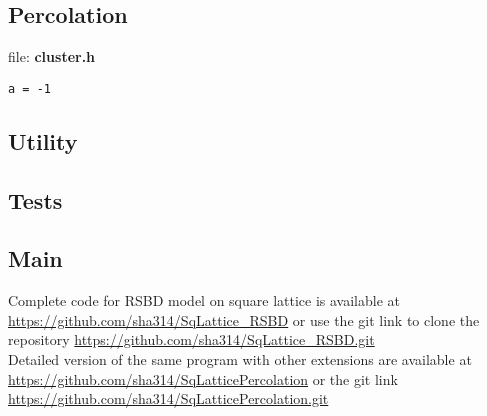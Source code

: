 	\subsection{Percolation}
	file: \textbf{cluster.h}
	\begin{lstlisting}[style=CStyle]
	a = -1
	\end{lstlisting}
	
	\subsection{Utility}
	
	\subsection{Tests}

	\subsection{Main}

	
Complete code for RSBD model on square lattice is available at
\url{https://github.com/sha314/SqLattice_RSBD}
or use the git link to clone the repository
\url{https://github.com/sha314/SqLattice_RSBD.git}
\\
Detailed version of the same program with other extensions are available at
\url{https://github.com/sha314/SqLatticePercolation}
or the git link
\url{https://github.com/sha314/SqLatticePercolation.git}




